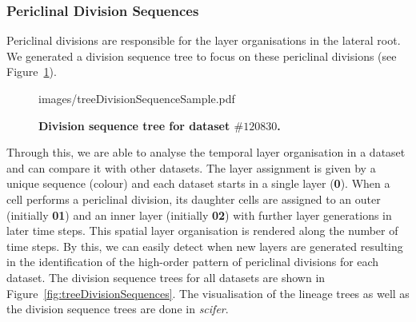 \documentclass[11pt,a4paper, final]{article}
\begin{document}
\subsubsection{Periclinal Division Sequences}
\label{sec:treeDivisionSequence}
\noindent
Periclinal divisions are responsible for the layer organisations in the lateral root. We generated a division sequence tree to focus on these periclinal divisions (see Figure~\ref{fig:treeDivisionSequenceSample}).
%
\begin{figure}[htbp]
	\begin{center}
		\begin{overpic}[width=0.8\linewidth]{images/treeDivisionSequenceSample.pdf}
		\end{overpic}
\caption[Division sequence tree.]
{
{\bf Division sequence tree for dataset $\#120830$.}
}
	\label{fig:treeDivisionSequenceSample}
	\end{center}
\end{figure}
%
Through this, we are able to analyse the temporal layer organisation in a dataset and can compare it with other datasets. The layer assignment is given by a unique sequence (colour) and each dataset starts in a single layer (\textbf{0}). When a cell performs a periclinal division, its daughter cells are assigned to an outer (initially \textbf{01}) and an inner layer (initially \textbf{02}) with further layer generations in later time steps. This spatial layer organisation is rendered along the number of time steps. By this, we can easily detect when new layers are generated resulting in the identification of the high-order pattern of periclinal divisions for each dataset. The division sequence trees for all datasets are shown in Figure~\ref{fig:treeDivisionSequences}. The visualisation of the lineage trees as well as the division sequence trees are done in \textit{scifer}.

\clearpage
\end{document}
